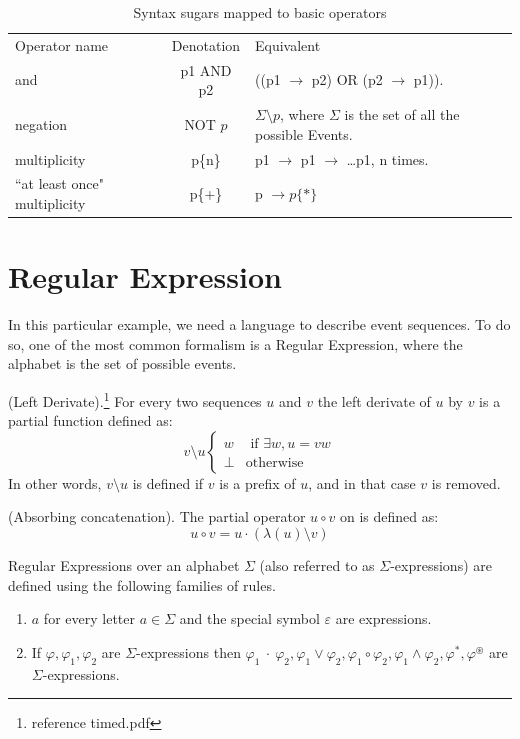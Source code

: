 		\begin{table}
		\caption{Syntax sugars mapped to basic operators}		
		\label{tab:cep:veplsugartobasic}
		\begin{tabular}{lcm{6cm}}
		\centering
		Operator name &	Denotation & Equivalent \\
		and &	p1 AND p2 & ((p1 $\rightarrow$ p2) OR (p2 $\rightarrow$ p1)). \\
		negation &	NOT $p$ & $\Sigma \setminus p$, where $\Sigma$ is the set of all the possible Events. \\
		multiplicity &	p\{n\} &	p1 $\rightarrow$ p1 $\rightarrow$ \dots p1, n times. \\
		``at least once" multiplicity &	p\{+\} & p $\rightarrow p\{\ast\}$ \\
		\end{tabular}
		\end{table}

		
	\section{Regular Expression}
		In this particular example, we need a language to describe event sequences. To do so, one of the most common
		formalism is a Regular Expression, where the alphabet is the set of possible events.
		
		\begin{dfn}
			(Left Derivate).\footnote{reference timed.pdf}
			For every two sequences $u$ and $v$ the left derivate of $u$ by $v$
			is a partial function defined as:
			\[ v \setminus u
				\begin{cases}
					w & \text{ if } \exists w,u = vw \\
					\perp & \text{otherwise}
				\end{cases}
			\]
			In other words, $v \setminus u$ is defined if $v$ is a prefix of $u$,
			and in that case $v$ is removed.
		\end{dfn}
		
		\begin{dfn}
			(Absorbing concatenation).
			The partial operator $u \circ v$ on  is defined as:
			\[ u \circ v = u \cdot (\lambda (u) \setminus v) \]
		\end{dfn}
		
		\begin{dfn}
			\label{dfn:cep:re}
			Regular Expressions over an alphabet $\Sigma$ (also referred to as $\Sigma$-expressions)
			are defined using the following families of rules.
			\begin{enumerate}
				\item \underline{$a$} for every letter $a \in \Sigma$ and the special symbol $\varepsilon$ are expressions.
				\item If $\varphi, \varphi_1, \varphi_2$ are $\Sigma$-expressions then %
					$ %
					\varphi_1~\cdot~\varphi_2,
					\varphi_1 \vee \varphi_2,
					\varphi_1 \circ \varphi_2,
					\varphi_1 \wedge \varphi_2,
					\varphi^\ast,
					\varphi^\circledast
					$ are $\Sigma$-expressions.
			\end{enumerate}
		\end{dfn}
		
